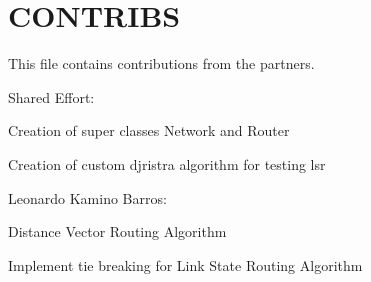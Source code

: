 \chapter{CONTRIBS}
\hypertarget{md__c_o_n_t_r_i_b_s}{}\label{md__c_o_n_t_r_i_b_s}
This file contains contributions from the partners.

Shared Effort\+:
\begin{DoxyItemize}
\item Creation of super classes {\ttfamily Network} and {\ttfamily Router}
\item Creation of custom djristra algorithm for testing lsr
\end{DoxyItemize}

Leonardo Kamino Barros\+:
\begin{DoxyItemize}
\item Distance Vector Routing Algorithm
\item Implement tie breaking for Link State Routing Algorithm 
\end{DoxyItemize}